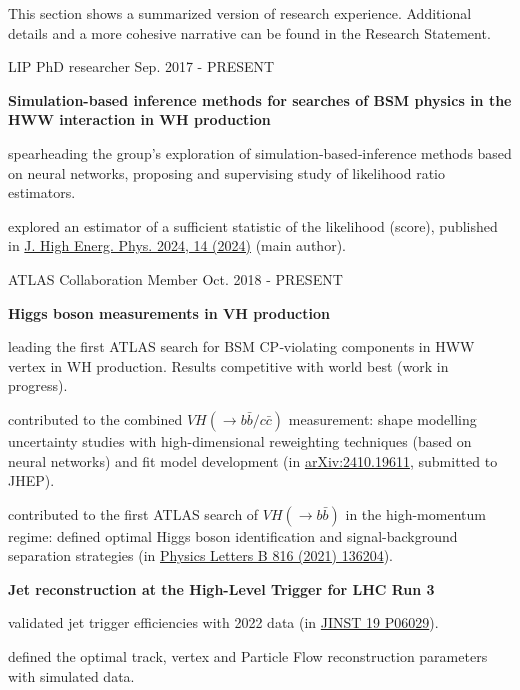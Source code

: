 
This section shows a summarized version of research experience. Additional details and a more cohesive narrative can be found in the Research Statement.

\begin{cventries}

    \cventry
    {LIP}
    {PhD researcher}
    {}
    {Sep. 2017 - PRESENT}
    {
        \textbf{Simulation-based inference methods for searches of BSM physics in the HWW interaction in WH production}\vspace{12pt}
        \begin{cvitems}      
            \item {spearheading the group's exploration of simulation‑based‑inference methods based on neural networks, proposing and supervising study of likelihood ratio estimators.}
            \item {explored an estimator of a sufficient statistic of the likelihood (score), published in \href{https://doi.org/10.1007/JHEP04(2024)014}{J. High Energ. Phys. 2024, 14 (2024)} (main author).}
        \end{cvitems}
    }

    \cventry
    {ATLAS Collaboration}
    {Member}
    {}
    {Oct. 2018 - PRESENT}
    {
        \textbf{Higgs boson measurements in VH production}\vspace{14pt}
        \begin{cvitems}
            \item {leading the first ATLAS search for BSM CP‑violating components in HWW vertex in WH production. Results competitive with world best (work in progress).}
            \item {contributed to the combined $VH(\to b\bar{b}/c\bar{c})$ measurement: shape modelling uncertainty studies with high-dimensional reweighting techniques (based on neural networks) and fit model development (in \href{https://arxiv.org/abs/2410.19611}{arXiv:2410.19611}, submitted to JHEP).}
            \item {contributed to the first ATLAS search of $VH(\to b\bar{b})$ in the high-momentum regime: defined optimal Higgs boson identification and signal-background separation strategies (in \href{https://doi.org/10.1016/j.physletb.2021.136204}{Physics Letters B 816 (2021) 136204}).}
        \end{cvitems}\vspace{19pt}
        \textbf{Jet reconstruction at the High-Level Trigger for LHC Run 3}\vspace{14pt}
        \begin{cvitems}
            \item {validated jet trigger efficiencies with 2022 data (in \href{https://doi.org/10.1088/1748-0221/19/06/P06029}{JINST 19 P06029}).}
            \item {defined the optimal track, vertex and Particle Flow reconstruction parameters with simulated data.}
        \end{cvitems}
    }


\end{cventries}
